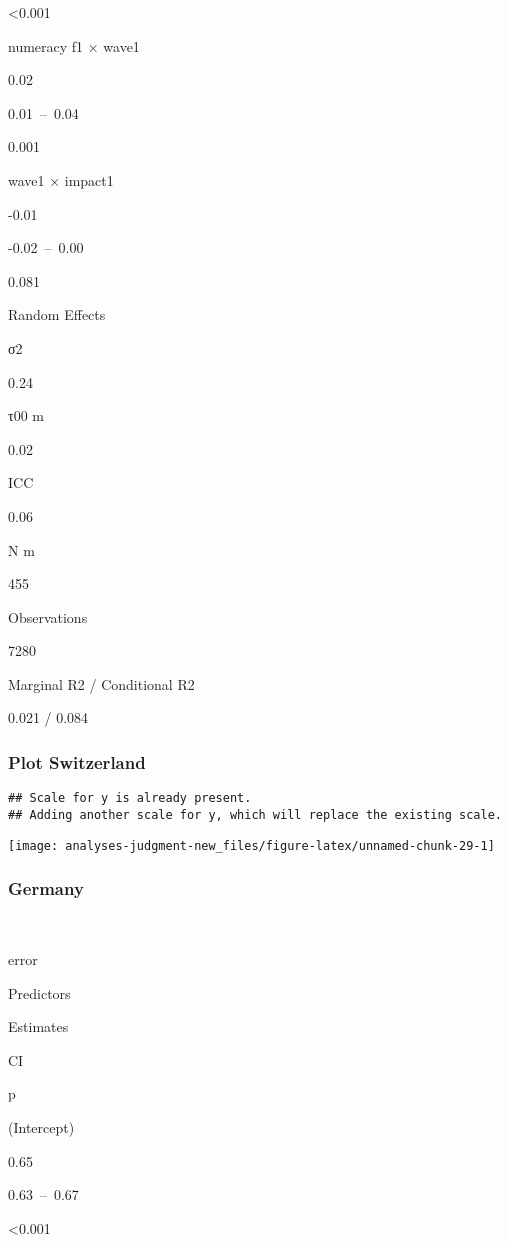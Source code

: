 \documentclass[
]{article}
\begin{document}
\textless0.001

numeracy f1 × wave1

0.02

0.01~--~0.04

0.001

wave1 × impact1

-0.01

-0.02~--~0.00

0.081

Random Effects

σ2

0.24

τ00 m

0.02

ICC

0.06

N m

455

Observations

7280

Marginal R2 / Conditional R2

0.021 / 0.084

\hypertarget{plot-switzerland}{%
\subsubsection{Plot Switzerland}\label{plot-switzerland}}

\begin{verbatim}
## Scale for y is already present.
## Adding another scale for y, which will replace the existing scale.
\end{verbatim}

\begin{center}\texttt{[image: analyses-judgment-new\_files/figure-latex/unnamed-chunk-29-1]} \end{center}

\hypertarget{germany}{%
\subsubsection{Germany}\label{germany}}

~

error

Predictors

Estimates

CI

p

(Intercept)

0.65

0.63~--~0.67

\textless0.001
\end{document}
